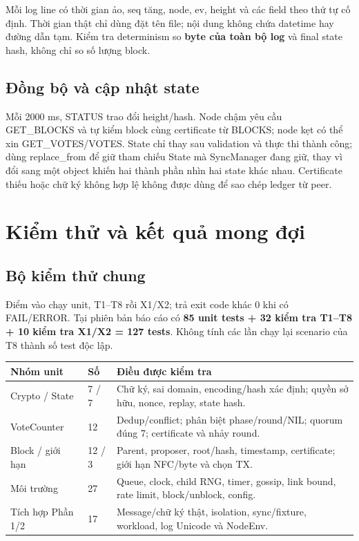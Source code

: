 \documentclass[11pt,a4paper]{article}
\newcommand{\code}[1]{\texttt{\detokenize{#1}}}
\newcommand{\nextpage}{\clearpage}
\begin{document}
Mỗi log line có thời gian ảo, seq tăng, node, ev, height và các field theo thứ tự cố định. Thời gian thật chỉ dùng đặt tên file; nội dung không chứa datetime hay đường dẫn tạm. Kiểm tra determinism so \textbf{byte của toàn bộ log} và final state hash, không chỉ so số lượng block.

\subsection{Đồng bộ và cập nhật state}
Mỗi 2000 ms, STATUS trao đổi height/hash. Node chậm yêu cầu GET\_BLOCKS và tự kiểm block cùng certificate từ BLOCKS; node kẹt có thể xin GET\_VOTES/VOTES. State chỉ thay sau validation và thực thi thành công; dùng replace\_from để giữ tham chiếu State mà SyncManager đang giữ, thay vì đổi sang một object khiến hai thành phần nhìn hai state khác nhau. Certificate thiếu hoặc chữ ký không hợp lệ không được dùng để sao chép ledger từ peer.

\nextpage
\section{Kiểm thử và kết quả mong đợi}
\subsection{Bộ kiểm thử chung}
Điểm vào \code{python -m tests.run_all} chạy unit, T1--T8 rồi X1/X2; trả exit code khác 0 khi có FAIL/ERROR. Tại phiên bản báo cáo có \textbf{85 unit tests + 32 kiểm tra T1--T8 + 10 kiểm tra X1/X2 = 127 tests}. Không tính các lần chạy lại scenario của T8 thành số test độc lập.

{\small\begin{tabularx}{\linewidth}{P{36mm}P{10mm}Y}
\toprule\textbf{Nhóm unit} & \textbf{Số} & \textbf{Điều được kiểm tra}\\\midrule
Crypto / State & 7 / 7 & Chữ ký, sai domain, encoding/hash xác định; quyền sở hữu, nonce, replay, state hash.\\
VoteCounter & 12 & Dedup/conflict; phân biệt phase/round/NIL; quorum đúng 7; certificate và nhảy round.\\
Block / giới hạn & 12 / 3 & Parent, proposer, root/hash, timestamp, certificate; giới hạn NFC/byte và chọn TX.\\
Môi trường & 27 & Queue, clock, child RNG, timer, gossip, link bound, rate limit, block/unblock, config.\\
Tích hợp Phần 1/2 & 17 & Message/chữ ký thật, isolation, sync/fixture, workload, log Unicode và NodeEnv.\\
\bottomrule\end{tabularx}}
\end{document}
